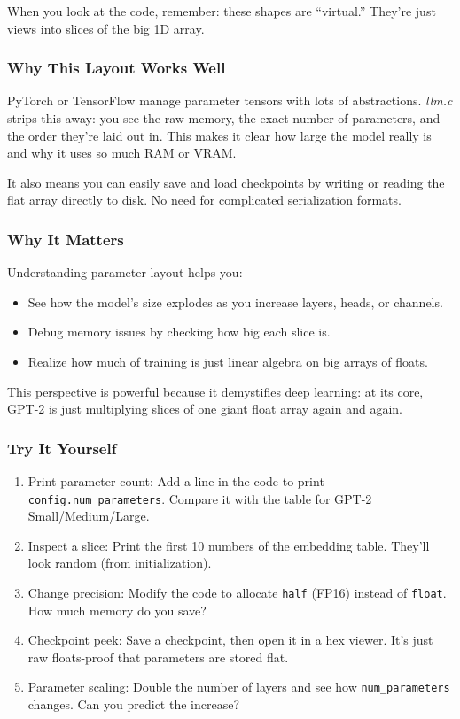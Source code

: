\documentclass[
  letterpaper,
  DIV=11,
  numbers=noendperiod]{scrreprt}
\providecommand{\tightlist}{%
  \setlength{\itemsep}{0pt}\setlength{\parskip}{0pt}}
\begin{document}
When you look at the code, remember: these shapes are ``virtual.''
They're just views into slices of the big 1D array.

\subsubsection{Why This Layout Works
Well}\label{why-this-layout-works-well}

PyTorch or TensorFlow manage parameter tensors with lots of
abstractions. \emph{llm.c} strips this away: you see the raw memory, the
exact number of parameters, and the order they're laid out in. This
makes it clear how large the model really is and why it uses so much RAM
or VRAM.

It also means you can easily save and load checkpoints by writing or
reading the flat array directly to disk. No need for complicated
serialization formats.

\subsubsection{Why It Matters}\label{why-it-matters-10}

Understanding parameter layout helps you:

\begin{itemize}
\tightlist
\item
  See how the model's size explodes as you increase layers, heads, or
  channels.
\item
  Debug memory issues by checking how big each slice is.
\item
  Realize how much of training is just linear algebra on big arrays of
  floats.
\end{itemize}

This perspective is powerful because it demystifies deep learning: at
its core, GPT-2 is just multiplying slices of one giant float array
again and again.

\subsubsection{Try It Yourself}\label{try-it-yourself-11}

\begin{enumerate}
\def\labelenumi{\arabic{enumi}.}
\tightlist
\item
  Print parameter count: Add a line in the code to print
  \texttt{config.num\_parameters}. Compare it with the table for GPT-2
  Small/Medium/Large.
\item
  Inspect a slice: Print the first 10 numbers of the embedding table.
  They'll look random (from initialization).
\item
  Change precision: Modify the code to allocate \texttt{half} (FP16)
  instead of \texttt{float}. How much memory do you save?
\item
  Checkpoint peek: Save a checkpoint, then open it in a hex viewer. It's
  just raw floats-proof that parameters are stored flat.
\item
  Parameter scaling: Double the number of layers and see how
  \texttt{num\_parameters} changes. Can you predict the increase?
\end{enumerate}
\end{document}
